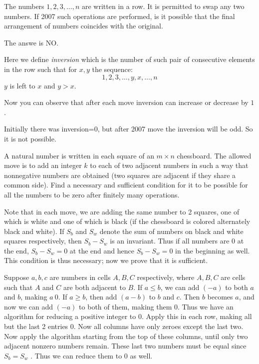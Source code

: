 \begin{example}
The numbers $1, 2, 3, \ldots ,n$ are written in a row. It is permitted to swap any two numbers. If 2007 such operations are performed, is it possible that the final arrangement of numbers coincides with the original.
\end{example}

\begin{soln}
The answe is NO.

Here we define \textit{inversion} which is the number of such pair of consecutive elements in the row such that for $x,y$ the sequence:
\[1, 2, 3, \ldots ,y, x, \ldots ,n\]
$y$ is left to $x$ and $y>x$.

Now you can observe that after each move inversion can increase or decrease by $1$.

Initially there was inversion=0, but after 2007 move the inversion will be odd. So it is not possible.
\end{soln}



\begin{example}
A natural number is written in each square of an $m \times n$
chessboard. The allowed move is to add an integer $k$ to each of
two adjacent numbers in such a way that nonnegative numbers
are obtained (two squares are adjacent if they share a common
side). Find a necessary and sufficient condition for it to be
possible for all the numbers to be zero after finitely many
operations.
\end{example}

\begin{soln}
Note that in each move, we are adding the same number to 2
squares, one of which is white and one of which is black (if the
chessboard is colored alternately black and white). If $S_b$ and $S_w$
denote the sum of numbers on black and white squares
respectively, then $S_b - S_w$ is an invariant. Thus if all numbers are 0
at the end, $S_b - S_w = 0$ at the end and hence $S_b - S_w = 0$ in the
beginning as well. This condition is thus necessary; now we prove
that it is sufficient.

Suppose $a, b, c$ are numbers in cells $A, B, C$ respectively, where
$A, B, C$ are cells such that $A$ and $C$ are both adjacent to $B$. If $a \le b$,
we can add $(-a)$ to both $a$ and $b$, making $a \ 0$. If $a \ge b$, then add $(a-b)$
to $b$ and $c$. Then $b$ becomes $a$, and now we can add $(-a)$ to both of
them, making them $0$. Thus we have an algorithm for reducing a
positive integer to $0$. Apply this in each row, making all but the
last 2 entries 0. Now all columns have only zeroes except the last
two. Now apply the algorithm starting from the top of these
columns, until only two adjacent nonzero numbers remain. These
last two numbers must be equal since $S_b = S_w$ . Thus we can reduce
them to 0 as well.
\end{soln}




